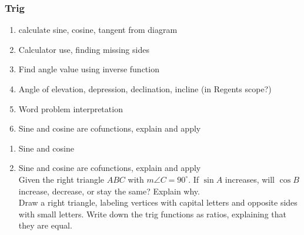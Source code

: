 \documentclass[12pt, twoside]{article}
\begin{document}
\subsubsection*{Trig}
  \begin{enumerate}
  \item calculate sine, cosine, tangent from diagram
  \item Calculator use, finding missing sides
  \item Find angle value using inverse function
  \item Angle of elevation, depression, declination, incline (in Regents scope?)
  \item Word problem interpretation
  \item Sine and cosine are cofunctions, explain and apply
  \end{enumerate}

  \begin{enumerate}
    \subsubsection*{Diagrams}
    \item Sine and cosine

  \item Sine and cosine are cofunctions, explain and apply\\
  Given the right triangle $ABC$ with $m\angle C=90^\circ$. If $\sin A$ increases, will $\cos B$ increase, decrease, or stay the same? Explain why.\\
  Draw a right triangle, labeling vertices with capital letters and opposite sides with small letters. Write down the trig functions as ratios, explaining that they are equal.
  \end{enumerate}

\newpage
\end{document}
